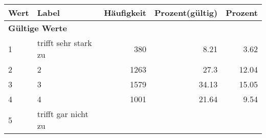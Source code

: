      \begin{longtable}{lXrrr}
     \toprule
     \textbf{Wert} & \textbf{Label} & \textbf{Häufigkeit} & \textbf{Prozent(gültig)} & \textbf{Prozent} \\
     \endhead
     \midrule
     \multicolumn{5}{l}{\textbf{Gültige Werte}}\\

     1 &
     \multicolumn{1}{X}{ trifft sehr stark zu   } &


       \num{380} &
       \num[round-mode=places,round-precision=2]{8,21} &
         \num[round-mode=places,round-precision=2]{3,62} \\

     2 &
     \multicolumn{1}{X}{ 2   } &


       \num{1263} &
       \num[round-mode=places,round-precision=2]{27,3} &
         \num[round-mode=places,round-precision=2]{12,04} \\

     3 &
     \multicolumn{1}{X}{ 3   } &


       \num{1579} &
       \num[round-mode=places,round-precision=2]{34,13} &
         \num[round-mode=places,round-precision=2]{15,05} \\

     4 &
     \multicolumn{1}{X}{ 4   } &


       \num{1001} &
       \num[round-mode=places,round-precision=2]{21,64} &
         \num[round-mode=places,round-precision=2]{9,54} \\

     5 &
     \multicolumn{1}{X}{ trifft gar nicht zu   } &



\end{longtable}

